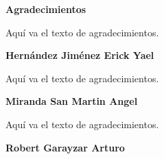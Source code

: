 
\thispagestyle{empty}
\raggedright
{\bfseries\LARGE Agradecimientos}\par
\vspace{0.5cm}
\normalfont\normalsize

Aquí va el texto de agradecimientos.\par
\vfill
\raggedleft
{\bfseries\large Hernández Jiménez Erick Yael}\par
\normalfont\normalsize
\newpage
\raggedright
Aquí va el texto de agradecimientos.\par
\vfill
\raggedleft
{\bfseries\large Miranda San Martin Angel}\par
\normalfont\normalsize
\newpage
\raggedright
Aquí va el texto de agradecimientos.\par
\vfill
\raggedleft
{\bfseries\large Robert Garayzar Arturo}\par
\normalfont\normalsize
\clearpage
\justifying